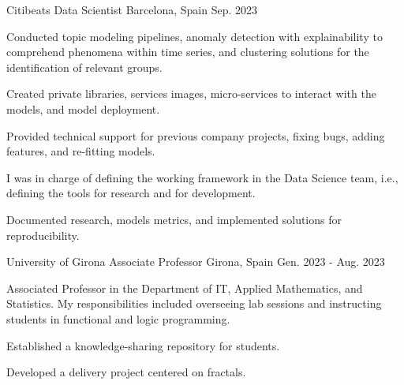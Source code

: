 

\begin{cventries}


  \cventry
  {Citibeats} %
  {Data Scientist} %
  {Barcelona, Spain} %
  {Sep. 2023} %
  {
  \begin{cvitems}
    \item {Conducted topic modeling pipelines, anomaly detection with
      explainability to comprehend phenomena within time series, and clustering
    solutions for the identification of relevant groups.}
    \item {Created private libraries, services images, micro-services to
      interact with the models, and model deployment.}
    \item {Provided technical support for previous company projects, fixing
      bugs, adding features, and re-fitting models.}
    \item {I was in charge of defining the working framework in the Data
      Science team, i.e., defining the tools for research and for development.}
    \item {Documented research, models metrics, and implemented solutions for
      reproducibility.}
  \end{cvitems}
}


  \cventry
  {University of Girona} %
  {Associate Professor} %
  {Girona, Spain} %
  {Gen. 2023 - Aug. 2023} %
  {
    \begin{cvitems} %
    \item {Associated Professor in the Department of IT,
      Applied Mathematics, and Statistics.
      My responsibilities included overseeing lab sessions and instructing students in functional and logic programming.}
    \item{Established a knowledge-sharing repository for students.}
    \item{Developed a delivery project centered on fractals.}
    \end{cvitems}
    }



\end{cventries}
